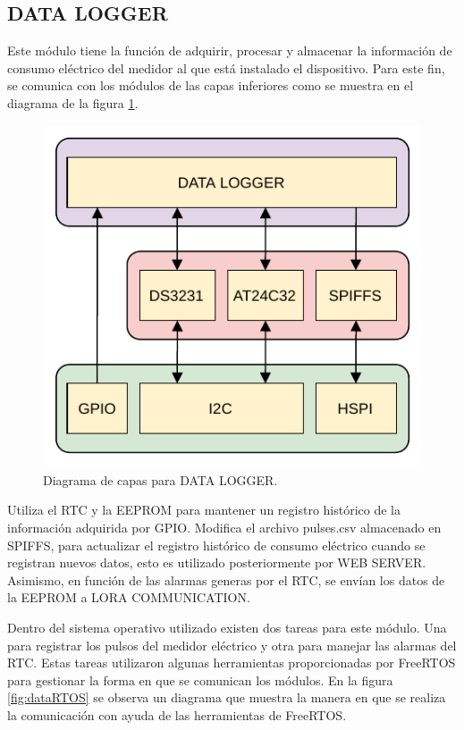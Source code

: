 \subsection{DATA LOGGER}

Este módulo tiene la función de adquirir, procesar y almacenar la información de consumo eléctrico del medidor al que está instalado el dispositivo. Para este fin, se comunica con los módulos de las capas inferiores como se muestra en el diagrama de la figura \ref{fig:dataLayers}.

\begin{figure}[h]
	\centering
	\includegraphics[scale=1]{./Figures/data_logger_diagram.pdf}
	\caption{Diagrama de capas para DATA LOGGER.}
		\label{fig:dataLayers}
\end{figure}

Utiliza el RTC y la EEPROM para mantener un registro histórico de la información adquirida por GPIO. Modifica el archivo pulses.csv almacenado en SPIFFS, para actualizar el registro histórico de consumo eléctrico cuando se registran nuevos datos, esto es utilizado posteriormente por WEB SERVER. Asimismo, en función de las alarmas generas por el RTC, se envían los datos de la EEPROM a LORA COMMUNICATION.

Dentro del sistema operativo utilizado existen dos tareas para este módulo. Una para registrar los pulsos del medidor eléctrico y otra para manejar las alarmas del RTC. Estas tareas utilizaron algunas herramientas proporcionadas por FreeRTOS para gestionar la forma en que se comunican los módulos. En la figura \ref{fig:dataRTOS} se observa un diagrama que muestra la manera en que se realiza la comunicación con ayuda de las herramientas de FreeRTOS.

